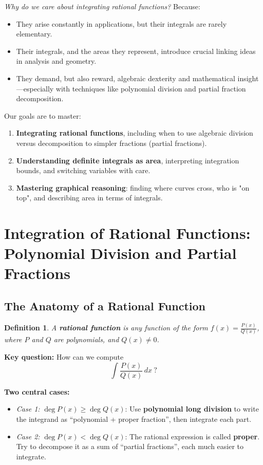 \documentclass[12pt]{article}
\newtheorem{definition}{Definition}[section]
\begin{document}
\emph{Why do we care about integrating rational functions?} Because:
\begin{itemize}
    \item They arise constantly in applications, but their integrals are rarely elementary.
    \item Their integrals, and the areas they represent, introduce crucial linking ideas in analysis and geometry.
    \item They demand, but also reward, algebraic dexterity and mathematical insight—especially with techniques like polynomial division and partial fraction decomposition.
\end{itemize}

Our goals are to master:
\begin{enumerate}[label=(\arabic*)]
    \item \textbf{Integrating rational functions}, including when to use algebraic division versus decomposition to simpler fractions (partial fractions).
    \item \textbf{Understanding definite integrals as area}, interpreting integration bounds, and switching variables with care.
    \item \textbf{Mastering graphical reasoning}: finding where curves cross, who is "on top", and describing area in terms of integrals.
\end{enumerate}

\section{Integration of Rational Functions: Polynomial Division and Partial Fractions}

\subsection{The Anatomy of a Rational Function}

\begin{definition}
A \textbf{rational function} is any function of the form \(\displaystyle f(x) = \frac{P(x)}{Q(x)}\), where \(P\) and \(Q\) are polynomials, and \(Q(x) \not= 0\).
\end{definition}

\textbf{Key question:} How can we compute
\[
\int \frac{P(x)}{Q(x)}\,dx~?
\]

\textbf{Two central cases:}
\begin{itemize}[label=--]
    \item \emph{Case 1:} \(\deg P(x) \geq \deg Q(x)\): Use \textbf{polynomial long division} to write the integrand as “polynomial + proper fraction”, then integrate each part.
    \item \emph{Case 2:} \(\deg P(x) < \deg Q(x)\): The rational expression is called \textbf{proper}. Try to decompose it as a sum of “partial fractions”, each much easier to integrate.
\end{itemize}
\end{document}

